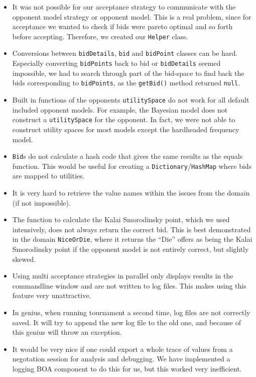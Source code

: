 \begin{itemize}
\item It was not possible for our acceptance strategy to communicate with the 
opponent model strategy or opponent model. This is a real problem, 
since for acceptance we wanted to check if bids were pareto optimal and so forth
before accepting. Therefore, we created our \texttt{Helper} class.
\item Conversions between \verb-bidDetails-, \verb-bid- and \verb-bidPoint- classes can be hard. Especially 
converting \verb-bidPoints- back to bid or \verb-bidDetails- seemed impossible, we had to search through
part of the bid-space to find back the bids corresponding to \verb-bidPoints-, as the \texttt{getBid()} method returned \texttt{null}.
\item Built in functions of the opponents \verb-utilitySpace- do not work for all default included 
opponent models. For example, the Bayesian model does not construct a \verb-utilitySpace- for the opponent. 
In fact, we were not able to construct utility spaces for most models except the hardheaded frequency model. 
\item \verb-Bid-s do not calculate a hash code that gives the same results as the equals function. This would 
be useful for creating a \verb-Dictionary-/\verb-HashMap- where bids are mapped to utilities.
\item It is very hard to retrieve the value names within the issues from the domain (if not impossible).
\item The function to calculate the Kalai Smorodinsky point, which we used intensively,
does not always return the correct bid. This is best demonstrated in the domain 
\verb-NiceOrDie-, where it returns the ``Die'' offers as being the Kalai Smorodinsky point if the opponent model
is not entirely correct, but slightly skewed.
\item Using multi acceptance strategies in parallel only displays results in the commandline window and are not written to log files. This makes using this feature very unattractive.
\item In genius, when running tournament a second time, log files are not correctly saved.
It will try to append the new log file to the old one, and because of this genius will throw
an exception. 
\item It would be very nice if one could export a whole trace of values from a negotation
session for analysis and debugging. We have implemented a logging BOA component to do this for us, but this worked very inefficient.
\end{itemize}

